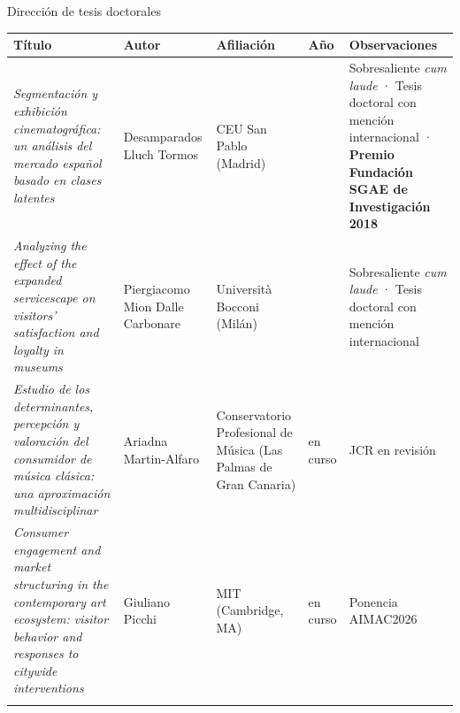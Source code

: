 \documentclass[
  8pt,
  ignorenonframetext,
  aspectratio=169,
  spanish,
]{beamer}
\newcommand{\lightrowrule}{\arrayrulecolor{black!25}\specialrule{0.4pt}{1pt}{1pt}\arrayrulecolor{black}}
\begin{document}
\begin{frame}{Dirección de tesis doctorales}
\label{direcciuxf3n-de-tesis-doctorales}
~

\begin{longtable}[]{@{}
  >{\raggedright\arraybackslash}p{}
  >{\raggedright\arraybackslash}p{}
  >{\raggedright\arraybackslash}p{}
  >{\raggedright\arraybackslash}p{}
  >{\centering\arraybackslash}p{}@{}}
\toprule\noalign{}
\begin{minipage}[b]{\linewidth}\raggedright
Título
\end{minipage} & \begin{minipage}[b]{\linewidth}\raggedright
Autor
\end{minipage} & \begin{minipage}[b]{\linewidth}\raggedright
Afiliación
\end{minipage} & \begin{minipage}[b]{\linewidth}\raggedright
Año
\end{minipage} & \begin{minipage}[b]{\linewidth}\centering
Observaciones
\end{minipage} \\
\midrule\noalign{}
\endhead
\bottomrule\noalign{}
\endlastfoot
\emph{Segmentación y exhibición cinematográfica: un análisis del mercado
español basado en clases latentes} & Desamparados Lluch Tormos & CEU San
Pablo (Madrid) & 2017 & Sobresaliente \emph{cum laude} · Tesis doctoral
con mención internacional · \textbf{Premio Fundación SGAE de
Investigación 2018} \\ \lightrowrule
\emph{Analyzing the effect of the expanded servicescape on visitors'
satisfaction and loyalty in museums} & Piergiacomo Mion Dalle Carbonare
& Università Bocconi (Milán) & 2022 & Sobresaliente \emph{cum laude} ·
Tesis doctoral con mención internacional \\ \lightrowrule
\emph{Estudio de los determinantes, percepción y valoración del
consumidor de música clásica: una aproximación multidisciplinar} &
Ariadna Martin-Alfaro & Conservatorio Profesional de Música (Las Palmas
de Gran Canaria) & en curso & JCR en revisión \\ \lightrowrule
\emph{Consumer engagement and market structuring in the contemporary art
ecosystem: visitor behavior and responses to citywide interventions} &
Giuliano Picchi & MIT (Cambridge, MA) & en curso & Ponencia AIMAC2026 \\ \lightrowrule
\end{longtable}


\end{frame}
\end{document}
